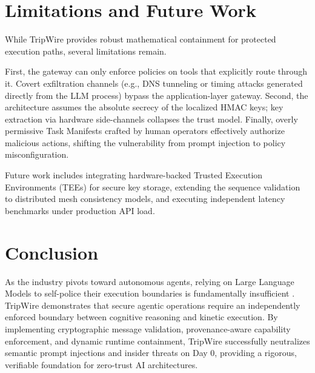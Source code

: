 \documentclass[10pt,a4paper]{article}
\begin{document}
\section{Limitations and Future Work}
While TripWire provides robust mathematical containment for protected execution paths, several limitations remain. 

First, the gateway can only enforce policies on tools that explicitly route through it. Covert exfiltration channels (e.g., DNS tunneling or timing attacks generated directly from the LLM process) bypass the application-layer gateway. Second, the architecture assumes the absolute secrecy of the localized HMAC keys; key extraction via hardware side-channels collapses the trust model. Finally, overly permissive Task Manifests crafted by human operators effectively authorize malicious actions, shifting the vulnerability from prompt injection to policy misconfiguration.

Future work includes integrating hardware-backed Trusted Execution Environments (TEEs) for secure key storage, extending the sequence validation to distributed mesh consistency models, and executing independent latency benchmarks under production API load.

\section{Conclusion}
As the industry pivots toward autonomous agents, relying on Large Language Models to self-police their execution boundaries is fundamentally insufficient \cite{nist_airmf}. TripWire demonstrates that secure agentic operations require an independently enforced boundary between cognitive reasoning and kinetic execution. By implementing cryptographic message validation, provenance-aware capability enforcement, and dynamic runtime containment, TripWire successfully neutralizes semantic prompt injections and insider threats on Day 0, providing a rigorous, verifiable foundation for zero-trust AI architectures.
\end{document}
